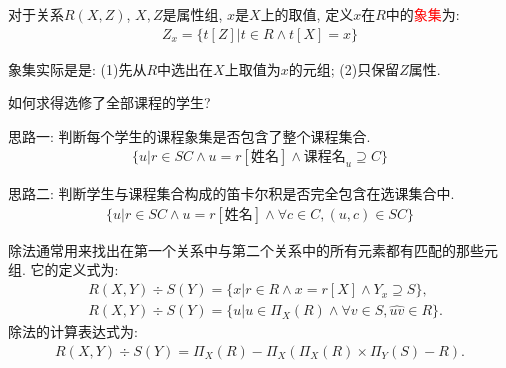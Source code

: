\begin{definition}
    对于关系$R(X,Z)$, $X,Z$是属性组, $x$是$X$上的取值, 定义$x$在$R$中的\textcolor{red}{象集}为:
\begin{align*}
    Z_x = \{t[Z] | t\in R \land t[X]=x\}
\end{align*}
\end{definition}

\begin{remark}
    象集实际是是: (1)先从$R$中选出在$X$上取值为$x$的元组; (2)只保留$Z$属性.
\end{remark}

\begin{example}
如何求得选修了全部课程的学生?
\end{example}

思路一: 判断每个学生的课程象集是否包含了整个课程集合.
\begin{align*}
    \{u|r\in SC \land u=r[\text{姓名}] \land \text{课程名}_u \supseteq C \}
\end{align*}

思路二: 判断学生与课程集合构成的笛卡尔积是否完全包含在选课集合中.
\begin{align*}
    \{u|r\in SC \land u=r[\text{姓名}] \land \forall c\in C, (u,c)\in SC\}    
\end{align*}

\begin{definition}[除法]
除法通常用来找出在第一个关系中与第二个关系中的所有元素都有匹配的那些元组. 它的定义式为:
\begin{align*}
    &R(X,Y) \div S(Y) = \{x|r\in R\land x=r[X] \land Y_x \supseteq S\}, \\
    &R(X,Y) \div S(Y) = \{u|u\in \Pi_X(R) \land \forall v \in S, \widehat{uv} \in R \}.
\end{align*}
除法的计算表达式为:
\begin{align*}
    R(X,Y) \div S(Y) = \Pi_X(R) - \Pi_X(\Pi_X(R)\times \Pi_Y(S) - R).
\end{align*}
\end{definition}


